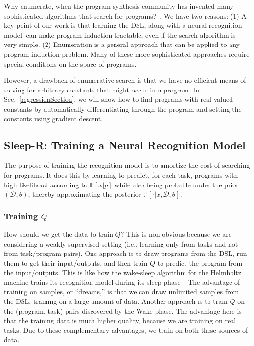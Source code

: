 \documentclass{article}
\newcommand{\probability}{\mathds{P}} %
\begin{document}
Why enumerate, when the program synthesis community has invented many
sophisticated algorithms that search for programs?~\cite{solar2008program,schkufza2013stochastic,feser2015synthesizing,osera2015type,polozov2015flashmeta}.
We have two reasons:
(1) A key point of our work is that learning the DSL, along with a neural recognition model, can make program induction tractable, even if the search algorithm is very simple.
(2) Enumeration is a general approach that can be applied to any program induction problem. Many of these more sophisticated approaches require special conditions on
  the space of  programs.

  However, a drawback of   enumerative search  is that we have no
efficient means of solving for arbitrary constants that might occur in a
program. In Sec.~\ref{regressionSection},
we will show how to find programs with real-valued constants
by automatically differentiating through the program and setting the constants using gradient descent.







\subsection{Sleep-R: Training a Neural Recognition Model}\label{recognitionSection}

The purpose of training the recognition model is to amortize the cost
of searching for programs.  It does this by learning to predict, for
each task, programs with high likelihood according to
$\probability[x|p]$ while also being probable under the prior
$(\mathcal{D},\theta)$,
thereby approximating the posterior $\probability[\cdot |x,\mathcal{D},\theta]$.

\subsubsection{Training $Q$}\label{recognitionTraining}
How should we get the data to train $Q$?
This is non-obvious  because we are considering a weakly supervised setting (i.e., learning only from tasks and not from task/program pairs).
One approach is to draw programs from the DSL,
run them to get their input/outputs,
and then train $Q$ to predict the program from the input/outputs.
This is like how the wake-sleep algorithm for the Helmholtz machine
trains its recognition model during its sleep phase~\cite{dayan1995helmholtz}.
The advantage of training on samples, or ``dreams,'' is that
we can draw unlimited samples from the DSL,
training on a large amount of data.
Another approach is
to train $Q$ on the (program, task)
pairs discovered by the Wake phase.
The advantage here
is that the training data is much higher quality,
because we are training on real tasks.
Due to these complementary advantages,
we train on both these sources of data.
\end{document}

